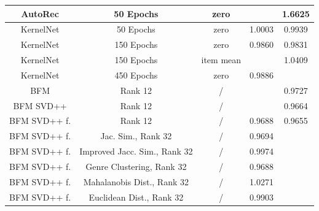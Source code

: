 \documentclass[10pt,conference,compsocconf]{IEEEtran}
\begin{document}
\begin{table}
{\begin{tabular}{|| c | c | c | c | c ||}
                AutoRec              & 50 Epochs                             & zero                    &                        & 1.6625                  \\
                \hline
                KernelNet            & 50 Epochs                             & zero                    & 1.0003                 & 0.9939                  \\
                KernelNet            & 150 Epochs                            & zero                    & 0.9860                 & 0.9831                  \\
                KernelNet            & 150 Epochs                            & item mean               &                        & 1.0409                  \\
                KernelNet            & 450 Epochs                            & zero                    & 0.9886                 &                         \\
                \hline
                BFM                  & Rank 12                               & /                       &                        & 0.9727                  \\
                BFM SVD++            & Rank 12                               & /                       &                        & 0.9664                  \\
                BFM SVD++ f.         & Rank 12                               & /                       & 0.9688                 & 0.9655                  \\
                BFM SVD++ f.         & Jac. Sim., Rank 32                    & /                       & 0.9694                 &                         \\
                BFM SVD++ f.         & Improved Jacc. Sim., Rank 32          & /                       & 0.9974                 &                         \\
                BFM SVD++ f.         & Genre Clustering, Rank 32             & /                       & 0.9688                 &                         \\
                BFM SVD++ f.         & Mahalanobis Dist., Rank 32            & /                       & 1.0271                 &                         \\
                BFM SVD++ f.         & Euclidean Dist., Rank 32              & /                       & 0.9903                 &                         \\

\end{tabular}}
\end{table}
\end{document}
